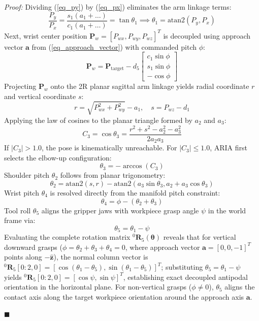 \documentclass[journal]{IEEEtran}
\newenvironment{proof}{\noindent\textit{Proof: }}{\hfill$\blacksquare$\vspace{1.5mm}}
\begin{document}
\begin{proof}
Dividing (\ref{eq_py}) by (\ref{eq_px}) eliminates the arm linkage terms:
\begin{equation}
\frac{P_y}{P_x} = \frac{s_1 (a_1 + \dots)}{c_1 (a_1 + \dots)} = \tan\theta_1 \implies \theta_1 = \text{atan2}(P_y, P_x)
\end{equation}
Next, wrist center position $\mathbf{P}_w = [P_{wx}, P_{wy}, P_{wz}]^T$ is decoupled using approach vector $\mathbf{a}$ from (\ref{eq_approach_vector}) with commanded pitch $\phi$:
\begin{equation}
\mathbf{P}_w = \mathbf{P}_{\text{target}} - d_5 \begin{bmatrix} c_1 \sin\phi \\ s_1 \sin\phi \\ -\cos\phi \end{bmatrix}
\end{equation}
Projecting $\mathbf{P}_w$ onto the 2R planar sagittal arm linkage yields radial coordinate $r$ and vertical coordinate $s$:
\begin{equation}
r = \sqrt{P_{wx}^2 + P_{wy}^2} - a_1, \quad s = P_{wz} - d_1
\end{equation}
Applying the law of cosines to the planar triangle formed by $a_2$ and $a_3$:
\begin{equation}
C_3 = \cos\theta_3 = \frac{r^2 + s^2 - a_2^2 - a_3^2}{2 a_2 a_3}
\end{equation}
If $|C_3| > 1.0$, the pose is kinematically unreachable. For $|C_3| \le 1.0$, ARIA first selects the elbow-up configuration:
\begin{equation}
\theta_3 = -\arccos(C_3)
\end{equation}
Shoulder pitch $\theta_2$ follows from planar trigonometry:
\begin{equation}
\theta_2 = \text{atan2}(s, r) - \text{atan2}\left(a_3 \sin\theta_3, a_2 + a_3 \cos\theta_3\right)
\end{equation}
Wrist pitch $\theta_4$ is resolved directly from the manifold pitch constraint:
\begin{equation}
\theta_4 = \phi - (\theta_2 + \theta_3)
\end{equation}
Tool roll $\theta_5$ aligns the gripper jaws with workpiece grasp angle $\psi$ in the world frame via:
\begin{equation}
\theta_5 = \theta_1 - \psi
\end{equation}
Evaluating the complete rotation matrix ${}^0\mathbf{R}_5(\boldsymbol{\theta})$ reveals that for vertical downward grasps ($\phi = \theta_2+\theta_3+\theta_4 = 0$, where approach vector $\mathbf{a} = [0, 0, -1]^T$ points along $-\hat{\mathbf{z}}$), the normal column vector is ${}^0\mathbf{R}_5[0:2, 0] = [\cos(\theta_1 - \theta_5), \sin(\theta_1 - \theta_5)]^T$; substituting $\theta_5 = \theta_1 - \psi$ yields ${}^0\mathbf{R}_5[0:2, 0] = [\cos\psi, \sin\psi]^T$, establishing exact decoupled antipodal orientation in the horizontal plane. For non-vertical grasps ($\phi \neq 0$), $\theta_5$ aligns the contact axis along the target workpiece orientation around the approach axis $\mathbf{a}$.


\end{proof}
\end{document}
